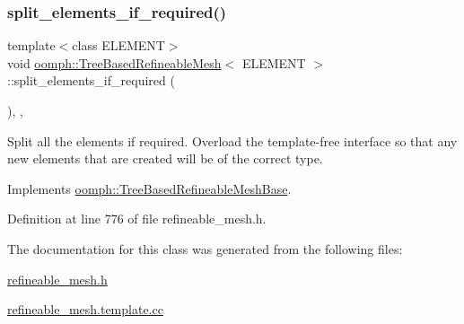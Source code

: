 \subsubsection{\texorpdfstring{split\+\_\+elements\+\_\+if\+\_\+required()}{split\_elements\_if\_required()}}
{\footnotesize\ttfamily template$<$class E\+L\+E\+M\+E\+NT$>$ \\
void \hyperlink{classoomph_1_1TreeBasedRefineableMesh}{oomph\+::\+Tree\+Based\+Refineable\+Mesh}$<$ E\+L\+E\+M\+E\+NT $>$\+::split\+\_\+elements\+\_\+if\+\_\+required (\begin{DoxyParamCaption}{ }\end{DoxyParamCaption})\hspace{0.3cm}{\ttfamily [inline]}, {\ttfamily [private]}, {\ttfamily [virtual]}}



Split all the elements if required. Overload the template-\/free interface so that any new elements that are created will be of the correct type. 



Implements \hyperlink{classoomph_1_1TreeBasedRefineableMeshBase_a86dace1f78991fb9b401a31215df89ef}{oomph\+::\+Tree\+Based\+Refineable\+Mesh\+Base}.



Definition at line 776 of file refineable\+\_\+mesh.\+h.



The documentation for this class was generated from the following files\+:\begin{DoxyCompactItemize}
\item 
\hyperlink{refineable__mesh_8h}{refineable\+\_\+mesh.\+h}\item 
\hyperlink{refineable__mesh_8template_8cc}{refineable\+\_\+mesh.\+template.\+cc}\end{DoxyCompactItemize}
